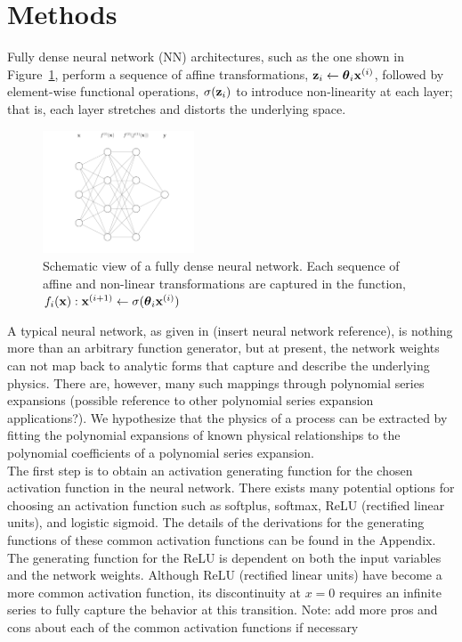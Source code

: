 \section{Methods}\label{methods}

Fully dense neural network (NN) architectures, such as the one shown in Figure~\ref{fig:nn-1}, perform a sequence of affine transformations, ${\bold z}_i \leftarrow \boldsymbol\theta_i {\bold x}^{(i)}$, followed by element-wise functional operations, $\sigma({\bold z}_i)$ to introduce non-linearity at each layer; that is, each layer stretches and distorts the underlying space.
\begin{figure}[htbp]
\begin{center}
\includegraphics[width=0.4\textwidth]{fig/neural-network-01}
\caption{Schematic view of a fully dense neural network. Each sequence of affine and non-linear transformations are captured in the function, $f_i({\bold x}): {\bold x}^{(i+1)} \leftarrow \sigma(\boldsymbol\theta_i {\bold x}^{(i)})$}
\label{fig:nn-1}
\end{center}
\end{figure}

A typical neural network, as given in (insert neural network reference), is nothing more than an arbitrary function generator, but at present, the network weights can not map back to analytic forms that capture and describe the underlying physics. There are, however, many such mappings through polynomial series expansions (possible reference to other polynomial series expansion applications?). We hypothesize that the physics of a process can be extracted by fitting the polynomial expansions of known physical relationships to the polynomial coefficients of a polynomial series expansion. \\

The first step is to obtain an activation generating function for the chosen activation function in the neural network. There exists many potential options for choosing an activation function such as softplus, softmax, ReLU (rectified linear units), and logistic sigmoid. The details of the derivations for the generating functions of these common activation functions can be found in the Appendix. The generating function for the ReLU is dependent on both the input variables and the network weights. Although ReLU (rectified linear units) have become a more common activation function, its discontinuity at $x = 0$ requires an infinite series to fully capture the behavior at this transition. {\color{red}Note: add more pros and cons about each of the common activation functions if necessary}

